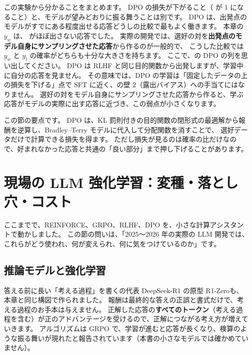 この実験から分かることをまとめます。
DPO の損失が下がること（ が 1 になること）と、モデルが望みどおりに振る舞うことは別です。
DPO は、出発点のモデルがすでにある程度出せる応答どうしの比較で最もよく働きます。
本章の $y_w$ は、 がほぼ出さない応答でした。
実際の開発では、選好の対を\textbf{出発点のモデル自身にサンプリングさせた応答}から作るのが一般的で\cite{dubey2024llama3}、
こうした比較では $y_w$ と $y_l$ の確率がどちらも十分な大きさを持ちます。
ここで、の DPO の列を思い出してください。
DPO は RLHF と同じ目的関数から出発しますが、学習中に自分の応答を見ません。
その意味では、DPO の学習は「固定したデータの上の損失を下げる」点で SFT に近く、の壁 2（露出バイアス）への手当てにはなりません。
選好の対をモデル自身にサンプリングさせた応答から作ると、学ぶ応答がモデルの実際に出す応答に近づき、この弱点が小さくなります。

この節の要点です。
DPO は、KL 罰則付きの目的関数の閉形式の最適解から報酬を逆算し、Bradley--Terry モデルに代入して分配関数を消すことで、
選好データだけで計算できる損失を得ます。
ただし損失が見るのは確率の比だけなので、好まれなかった応答と共通の「良い部分」まで押し下げることがあります。

\section{現場の LLM 強化学習：変種・落とし穴・コスト}\label{sec:rl-variants}

ここまでで、REINFORCE、GRPO、RLHF、DPO を、小さな計算アシスタントで動かしました。
この節の問いは、「2025〜2026 年の実際の LLM 開発では、これらがどう使われ、何が変えられ、何に気をつけているのか」です。

\subsection{推論モデルと強化学習}

答える前に長い「考える過程」を書くの代表 DeepSeek-R1 の原型 R1-Zero\cite{guo2025deepseekr1}も、本章と同じ構図で作られました。
報酬は最終的な答えの正誤と書式だけで、考える過程のお手本は与えません。
正解した応答の\textbf{すべてのトークン}（考える過程を含む）が正のアドバンテージを受けるので、正解につながる考え方が増えていきます。
アルゴリズムは GRPO で、学習が進むと応答が長くなり、検算のような振る舞いが現れたと報告されています（本書の小さなモデルでは確かめていません）。

